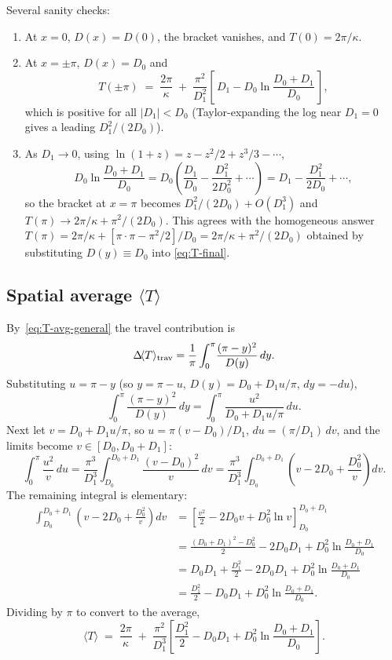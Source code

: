 Several sanity checks:
\begin{enumerate}[label=(\roman*)]
\item At $x=0$, $D(x)=D(0)$, the bracket vanishes, and $T(0)=2\pi/\kappa$.
\item At $x=\pm\pi$, $D(x)=D_0$ and
\[
T(\pm\pi)\;=\;\frac{2\pi}{\kappa}\;+\;\frac{\pi^2}{D_1^2}\!\left[\,D_1 - D_0\ln\!\frac{D_0+D_1}{D_0}\,\right],
\]
which is positive for all $|D_1|<D_0$ (Taylor-expanding the log near $D_1=0$
gives a leading $D_1^2/(2D_0)$).
\item As $D_1\to 0$, using $\ln(1+z)=z-z^2/2+z^3/3-\cdots$,
\[
D_0\ln\frac{D_0+D_1}{D_0}=D_0\!\left(\frac{D_1}{D_0}-\frac{D_1^2}{2D_0^2}+\cdots\right)
=D_1-\frac{D_1^2}{2D_0}+\cdots,
\]
so the bracket at $x=\pi$ becomes $D_1^2/(2D_0)+O(D_1^3)$ and
$T(\pi)\to 2\pi/\kappa+\pi^2/(2D_0)$.  This agrees with the homogeneous answer
$T(\pi)=2\pi/\kappa+[\pi\cdot\pi-\pi^2/2]/D_0=2\pi/\kappa+\pi^2/(2D_0)$
obtained by substituting $D(y)\equiv D_0$ into \eqref{eq:T-final}.
\end{enumerate}

\subsection{Spatial average \texorpdfstring{$\langle T\rangle$}{<T>}}

By~\eqref{eq:T-avg-general} the travel contribution is
\[
\Delta\!\langle T\rangle_{\rm trav}
=\frac{1}{\pi}\int_0^\pi\!\frac{(\pi-y)^2}{D(y)}\,dy.
\]
Substituting $u=\pi-y$ (so $y=\pi-u$, $D(y)=D_0+D_1 u/\pi$, $dy=-du$),
\[
\int_0^\pi\!\frac{(\pi-y)^2}{D(y)}\,dy
=\int_0^\pi\!\frac{u^2}{D_0+D_1 u/\pi}\,du.
\]
Next let $v=D_0+D_1 u/\pi$, so $u=\pi(v-D_0)/D_1$, $du=(\pi/D_1)\,dv$, and the
limits become $v\in[D_0,D_0+D_1]$:
\[
\int_0^\pi\!\frac{u^2}{v}\,du
=\frac{\pi^3}{D_1^3}\!\int_{D_0}^{D_0+D_1}\!\frac{(v-D_0)^2}{v}\,dv
=\frac{\pi^3}{D_1^3}\!\int_{D_0}^{D_0+D_1}\!\left(v - 2D_0 + \frac{D_0^2}{v}\right)dv.
\]
The remaining integral is elementary:
\begin{align*}
\int_{D_0}^{D_0+D_1}\!\left(v-2D_0+\frac{D_0^2}{v}\right)dv
&= \left[\frac{v^2}{2}-2D_0 v+D_0^2\ln v\right]_{D_0}^{D_0+D_1}\\
&=\frac{(D_0+D_1)^2-D_0^2}{2} - 2D_0 D_1 + D_0^2\ln\!\frac{D_0+D_1}{D_0}\\
&=D_0 D_1+\frac{D_1^2}{2} - 2D_0 D_1 + D_0^2\ln\!\frac{D_0+D_1}{D_0}\\
&=\frac{D_1^2}{2}-D_0 D_1+D_0^2\ln\!\frac{D_0+D_1}{D_0}.
\end{align*}
Dividing by $\pi$ to convert to the average,
\begin{equation}
\boxed{\;
\langle T\rangle\;=\;\frac{2\pi}{\kappa}
\;+\;\frac{\pi^2}{D_1^3}\!\left[\frac{D_1^2}{2}-D_0 D_1+D_0^2\ln\!\frac{D_0+D_1}{D_0}\right].
\;}\label{eq:T-avg-tent}
\end{equation}


